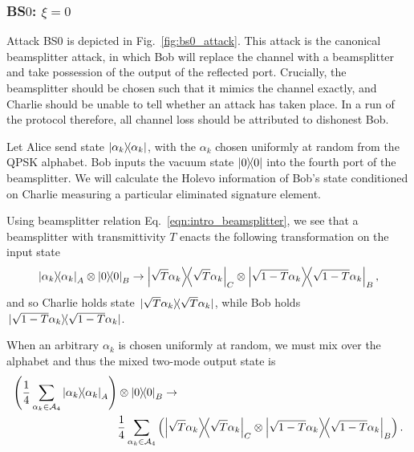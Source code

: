 
\subsubsection{BS$0$: $\xi = 0$}\label{sec:qds_bs0}
Attack BS$0$ is depicted in Fig.~\ref{fig:bs0_attack}. This attack is the canonical beamsplitter attack, in which Bob will replace the channel with a beamsplitter and take possession of the output of the reflected port. Crucially, the beamsplitter should be chosen such that it mimics the channel exactly, and Charlie should be unable to tell whether an attack has taken place. In a run of the protocol therefore, all channel loss should be attributed to dishonest Bob.


Let Alice send state $\dyad{\alpha_k}$, with the $\alpha_k$ chosen uniformly at random from the QPSK alphabet. Bob inputs the vacuum state $\dyad{0}$ into the fourth port of the beamsplitter. We will calculate the Holevo information of Bob's state conditioned on Charlie measuring a particular eliminated signature element.

Using beamsplitter relation Eq.~\ref{eqn:intro_beamsplitter}, we see that a beamsplitter with transmittivity $T$ enacts the following transformation on the input state
\begin{equation}
\dyad{\alpha_k}_A \otimes \dyad{0}_B \rightarrow \dyad{\sqrt{T} \alpha_k}_C \otimes \dyad{\sqrt{1-T}\alpha_k}_{B},
\end{equation}
and so Charlie holds state $\dyad*{\sqrt{T}\alpha_k}$, while Bob holds $\dyad*{\sqrt{1-T}\alpha_k}$.

When an arbitrary $\alpha_k$ is chosen uniformly at random, we must mix over the alphabet and thus the mixed two-mode output state is
\begin{align}
\left(\frac{1}{4}\sum_{\alpha_k \in \mathcal{A}_4} \dyad{\alpha_k}_A\right) &\otimes \dyad{0}_B \rightarrow \notag \\
&\frac{1}{4}\sum_{\alpha_k \in \mathcal{A}_4} \left(\dyad{\sqrt{T}\alpha_k}_C \otimes \dyad{\sqrt{1-T}\alpha_k}_B\right).
\end{align}

